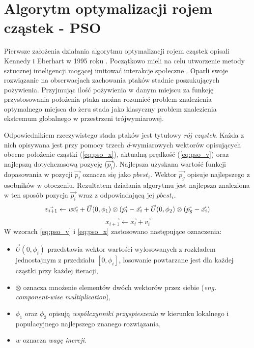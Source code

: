 \section{Algorytm optymalizacji rojem cząstek - PSO}
\label{sec:pso}
\par
Pierwsze założenia działania algorytmu optymalizacji rojem cząstek opisali Kennedy i Eberhart w 1995 roku \cite{kennedy1995pso}. Początkowo mieli na celu utworzenie metody sztucznej inteligencji mogącej imitować interakcje społeczne \cite{poli2007particle}. Oparli swoje rozwiązanie na obserwacjach zachowania ptaków stadnie poszukujących pożywienia. Przyjmując ilość pożywienia w danym miejscu za funkcję przystosowania położenia ptaka można rozumieć problem znalezienia optymalnego miejsca do żeru stada jako klasyczny problem znalezienia ekstremum globalnego w przestrzeni trójwymiarowej.
\par
Odpowiednikiem rzeczywistego stada ptaków jest tytułowy \emph{rój cząstek}. Każda z nich opisywana jest przy pomocy trzech \emph{d}-wymiarowych wektorów opisujących obecne położenie cząstki (\ref{eq:pso_x}), aktualną prędkość (\ref{eq:pso_v}) oraz najlepszą dotychczasową pozycję ($\vec{p_i}$). Najlepsza uzyskana wartość funkcji dopasowania w pozycji $\vec{p_i}$ oznacza się jako $pbest_i$. Wektor $\vec{p_g}$ opisuje najlepszego z osobników w otoczeniu. Rezultatem działania algorytmu jest najlepsza znaleziona w ten sposób pozycja $\vec{p_i}$ wraz z odpowiadającą jej $pbest_i$.
\begin{equation} \label{eq:pso_v}
\vec{v_{i+1}} \leftarrow \emph{w}\vec{v_i} + \vec{U}(0,\phi_1)\otimes(\vec{p_i}-\vec{x_i}+\vec{U}(0,\phi_2)\otimes(\vec{p_g}-\vec{x_i})
\end{equation}
\begin{equation} \label{eq:pso_x}
\vec{x_{i+1}} \leftarrow \vec{x_i} + \vec{v_i}
\end{equation}
W wzorach \ref{eq:pso_v} i \ref{eq:pso_x} zastosowano następujące oznaczenia:
\begin{itemize}
\item $\vec{U}(0,\phi_i)$ przedstawia wektor wartości wylosowanych z rozkładem jednostajnym z przedziału $[0, \phi_i]$, losowanie powtarzane jest dla każdej cząstki przy każdej iteracji,
\item $\otimes$ oznacza mnożenie elementów dwóch wektorów przez siebie (\emph{eng. component-wise multiplication}),
\item $\phi_1$ oraz $\phi_2$ opisują \emph{współczynniki przyspieszenia} w kierunku lokalnego i populacyjnego najlepszego znanego rozwiązania,
\item $w$ oznacza \emph{wagę inercji}.
\end{itemize}
